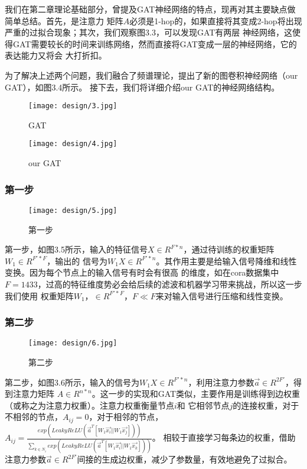 我们在第二章理论基础部分，曾提及GAT神经网络的特点，现再对其主要缺点做简单总结。首先，是注意力
矩阵$A$必须是1-hop的，如果直接将其变成2-hop将出现严重的过拟合现象；其次，我们观察图3.3，可以发现GAT有两层
神经网络，这使得GAT需要较长的时间来训练网络，然而直接将GAT变成一层的神经网络，它的表达能力又将会
大打折扣。

为了解决上述两个问题，我们融合了频谱理论，提出了新的图卷积神经网络（our GAT），如图3.4所示。
接下去，我们将详细介绍our GAT的神经网络结构。
\begin{figure}[htbp]
    \centering
    \begin{minipage}[t]{0.48\textwidth}
    \centering
    \captionsetup{width=5cm}
    \texttt{[image: design/3.jpg]}
    \caption{\label{3-3}GAT}
    \end{minipage}
    \begin{minipage}[t]{0.48\textwidth}
    \centering
    \captionsetup{width=5cm}
    \texttt{[image: design/4.jpg]}
    \caption{\label{3-4}our GAT}
    \end{minipage}
\end{figure}

\subsubsection{第一步}
\begin{figure}[ht]
    \centering
    \captionsetup{width=10cm}
    \texttt{[image: design/5.jpg]}
    \caption{\label{3-5}第一步}
\end{figure}
第一步，如图3.5所示，输入的特征信号$ X \in R^{F*n} $，通过待训练的权重矩阵$ W_1 \in R^{F'*F} $，输出的
信号为$ W_{1}X \in R^{F'*n} $。其作用主要是给输入信号降维和线性变换。因为每个节点上的输入信号有时会有很高
的维度，如在cora数据集中$ F = 1433 $，过高的特征维度势必会给后续的滤波和机器学习带来挑战，所以这一步我们使用
权重矩阵$ W_1，\in R^{F'*F}，F \ll F $来对输入信号进行压缩和线性变换。

\subsubsection{第二步}
\begin{figure}[ht]
    \centering
    \captionsetup{width=10cm}
    \texttt{[image: design/6.jpg]}
    \caption{\label{3-6}第二步}
\end{figure}
第二步，如图3.6所示，输入的信号为$ W_{1}X \in R^{F'*n} $，利用注意力参数$ \vec{a} \in R^{2F'} $，得到注意力矩阵
$A \in R^{n*n}$。这一步的实现和GAT类似，主要作用是训练得到边权重（或称之为注意力权重）。注意力权重衡量节点$i$和
它相邻节点$j$的连接权重，对于不相邻的节点，$A_{ij} = 0$，对于相邻的节点，$ A_{ij} = \frac{exp(LeakyReLU(\vec{a}^{T}[W_{1}\vec{x_{i}}||W_{1}\vec{x_{j}}]))} { {\textstyle \sum_{k\in N_{i} }^{}} exp(LeakyReLU(\vec{a}^{T}[W_{1}\vec{x_{i}}||W_{1}\vec{x_{k}}]))} $。
相较于直接学习每条边的权重，借助注意力参数$ \vec{a} \in R^{2F'} $间接的生成边权重，减少了参数量，有效地避免了过拟合。

